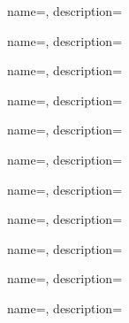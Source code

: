 {
  name={\ITph},
  description={\ITph{}}
}

{
  name={\ITph},
  description={\ITph{}}
}

{
  name={\ITph},
  description={\ITph{}}
}

{
  name={\ITph},
  description={\ITph{}}
}

{
  name={\ITph},
  description={\ITph{}}
}

{
  name={\ITph},
  description={\ITph{}}
}

{
  name={\ITph},
  description={\ITph{}}
}

{
  name={\ITph},
  description={\ITph{}}
}

{
  name={\ITph},
  description={\ITph{}}
}

{
  name={\ITph},
  description={\ITph{}}
}

{
  name={\ITph},
  description={\ITph{}}
}


